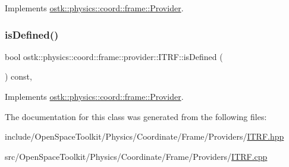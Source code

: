 Implements \hyperlink{classostk_1_1physics_1_1coord_1_1frame_1_1_provider_a38b86a589f46f8b8a9c97ab2776f37d1}{ostk\+::physics\+::coord\+::frame\+::\+Provider}.

\mbox{\label{classostk_1_1physics_1_1coord_1_1frame_1_1provider_1_1_i_t_r_f_a2f3a53b002d54f1adf829cefc2cf7393}} 
\subsubsection{\texorpdfstring{is\+Defined()}{isDefined()}}
{\footnotesize\ttfamily bool ostk\+::physics\+::coord\+::frame\+::provider\+::\+I\+T\+R\+F\+::is\+Defined (\begin{DoxyParamCaption}{ }\end{DoxyParamCaption}) const\hspace{0.3cm}{\ttfamily [override]}, {\ttfamily [virtual]}}



Implements \hyperlink{classostk_1_1physics_1_1coord_1_1frame_1_1_provider_a27acab0012649796b97956fed1a91493}{ostk\+::physics\+::coord\+::frame\+::\+Provider}.



The documentation for this class was generated from the following files\+:\begin{DoxyCompactItemize}
\item 
include/\+Open\+Space\+Toolkit/\+Physics/\+Coordinate/\+Frame/\+Providers/\hyperlink{_i_t_r_f_8hpp}{I\+T\+R\+F.\+hpp}\item 
src/\+Open\+Space\+Toolkit/\+Physics/\+Coordinate/\+Frame/\+Providers/\hyperlink{_i_t_r_f_8cpp}{I\+T\+R\+F.\+cpp}\end{DoxyCompactItemize}
